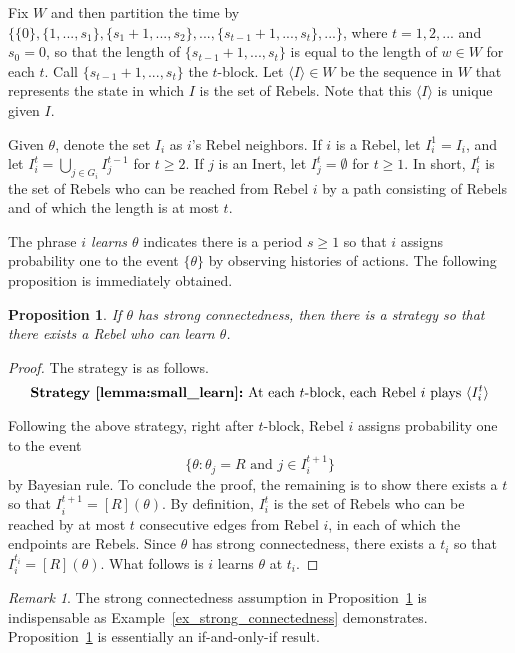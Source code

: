 \documentclass[12pt,letter]{article}
\newtheorem{proposition}{Proposition}[section]
\theoremstyle{definition}
\theoremstyle{remark}
\newtheorem*{remark}{Remark}
\theoremstyle{claim}
\begin{document}
Fix $W$ and then partition the time by $\{\{0\},\{1,...,s_1\},\{s_1+1,...,s_2\},...,\{s_{t-1}+1,...,s_t\},...\}$, where $t=1,2,...$ and $s_{0}=0$, so that the length of $\{s_{t-1}+1,...,s_t\}$ is equal to the length of $w\in W$ for each $t$. Call $\{s_{t-1}+1,...,s_t\}$ the $t$-block. Let $\langle I \rangle\in W$ be the sequence in $W$ that represents the state in which $I$ is the set of Rebels. Note that this $\langle I \rangle$ is unique given $I$.

Given $\theta$, denote the set $I_i$ as $i$'s Rebel neighbors. If $i$ is a Rebel, let $I^1_i= I_i$, and let $I^t_i= \bigcup_{j\in G_i} I^{t-1}_j$ for $t\geq 2$. If $j$ is an Inert, let $I^t_j=\emptyset$ for $t\geq 1$. In short, $I^t_i$ is the set of Rebels who can be reached from Rebel $i$ by a path consisting of Rebels and of which the length is at most $t$.

The phrase \textit{$i$ learns $\theta$} indicates there is a period $s\geq 1$ so that $i$ assigns probability one to the event $\{\theta\}$ by observing histories of actions. The following proposition is immediately obtained. 
\begin{proposition}
\label{lemma:small_learn}
If $\theta$ has strong connectedness, then there is a strategy so that there exists a Rebel who can learn $\theta$.
\end{proposition}
\begin{proof} The strategy is as follows.
\[\textbf{Strategy~\ref{lemma:small_learn}:}\text{ At each $t$-block, each Rebel $i$ plays $\langle {I^t_i} \rangle$}\]

Following the above strategy, right after $t$-block, Rebel $i$ assigns probability one to the event \[\{\theta: \text{$\theta_j=R$ and $j\in I^{t+1}_i$}\}\] by Bayesian rule. To conclude the proof, the remaining is to show there exists a $t$ so that $I^{t+1}_i=[R](\theta)$. By definition, $I^t_i$ is the set of Rebels who can be reached by at most $t$ consecutive edges from Rebel $i$, in each of which the endpoints are Rebels. Since $\theta$ has strong connectedness, there exists a $t_i$ so that $I^{t_i}_i=[R](\theta)$. What follows is $i$ learns $\theta$ at $t_i$.
\end{proof}

\begin{remark}
The strong connectedness assumption in Proposition~\ref{lemma:small_learn} is indispensable as Example~\ref{ex_strong_connectedness} demonstrates. Proposition~\ref{lemma:small_learn} is essentially an if-and-only-if result.
\end{remark}
\end{document}
